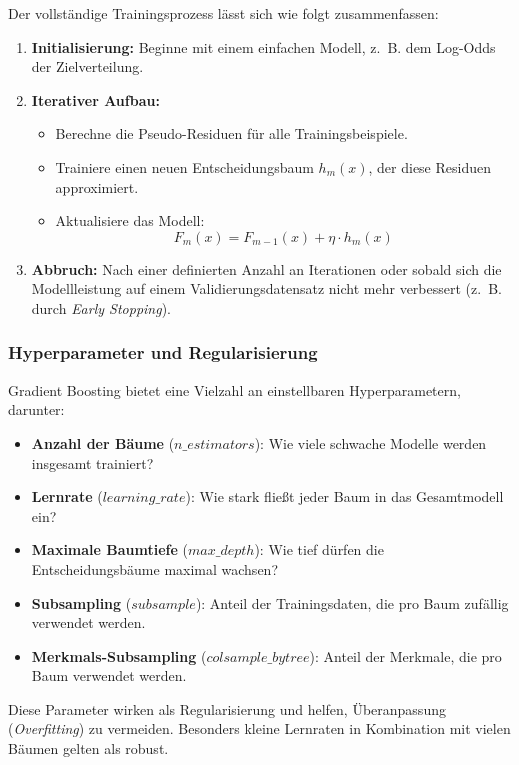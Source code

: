 \documentclass[10pt]{scrartcl}
\begin{document}
Der vollständige Trainingsprozess lässt sich wie folgt zusammenfassen:

\begin{enumerate}
    \item \textbf{Initialisierung:} Beginne mit einem einfachen Modell, z.~B. dem Log-Odds der Zielverteilung.
    \item \textbf{Iterativer Aufbau:}
    \begin{itemize}
        \item Berechne die Pseudo-Residuen für alle Trainingsbeispiele.
        \item Trainiere einen neuen Entscheidungsbaum $h_m(x)$, der diese Residuen approximiert.
        \item Aktualisiere das Modell:
        \[
        F_m(x) = F_{m-1}(x) + \eta \cdot h_m(x)
        \]
    \end{itemize}
    \item \textbf{Abbruch:} Nach einer definierten Anzahl an Iterationen oder sobald sich die Modellleistung auf einem Validierungsdatensatz nicht mehr verbessert (z.~B. durch \textit{Early Stopping}).
\end{enumerate}

\subsubsection{Hyperparameter und Regularisierung}

Gradient Boosting bietet eine Vielzahl an einstellbaren Hyperparametern, darunter:

\begin{itemize}
    \item \textbf{Anzahl der Bäume} ($n\_estimators$): Wie viele schwache Modelle werden insgesamt trainiert?
    \item \textbf{Lernrate} ($learning\_rate$): Wie stark fließt jeder Baum in das Gesamtmodell ein?
    \item \textbf{Maximale Baumtiefe} ($max\_depth$): Wie tief dürfen die Entscheidungsbäume maximal wachsen?
    \item \textbf{Subsampling} ($subsample$): Anteil der Trainingsdaten, die pro Baum zufällig verwendet werden.
    \item \textbf{Merkmals-Subsampling} ($colsample\_bytree$): Anteil der Merkmale, die pro Baum verwendet werden.
\end{itemize}

Diese Parameter wirken als Regularisierung und helfen, Überanpassung (\textit{Overfitting}) zu vermeiden. Besonders kleine Lernraten in Kombination mit vielen Bäumen gelten als robust.
\end{document}
